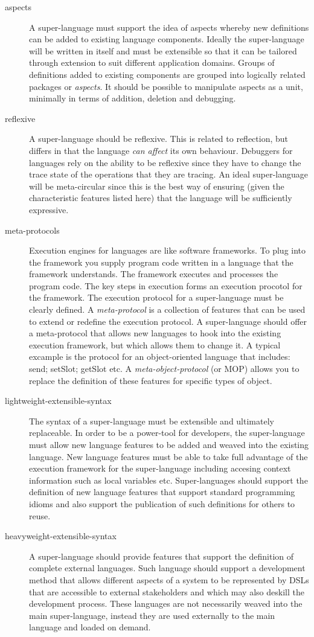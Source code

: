 \begin{description}
\item [{aspects}] A super-language must support the idea of aspects whereby
new definitions can be added to existing language components. Ideally
the super-language will be written in itself and must be extensible
so that it can be tailored through extension to suit different application
domains. Groups of definitions added to existing components are grouped
into logically related packages or \emph{aspects}. It should be possible
to manipulate aspects as a unit, minimally in terms of addition, deletion
and debugging.
\item [{reflexive}] A super-language should be reflexive. This is related
to reflection, but differs in that the language \emph{can affect}
its own behaviour. Debuggers for languages rely on the ability to
be reflexive since they have to change the trace state of the operations
that they are tracing. An ideal super-language will be meta-circular
since this is the best way of ensuring (given the characteristic features
listed here) that the language will be sufficiently expressive.
\item [{meta-protocols}] Execution engines for languages are like software
frameworks. To plug into the framework you supply program code written
in a language that the framework understands. The framework executes
and processes the program code. The key steps in execution forms an
execution procotol for the framework. The execution protocol for a
super-language must be clearly defined. A \emph{meta-protocol }is
a collection of features that can be used to extend or redefine the
execution protocol. A super-language should offer a meta-protocol
that allows new languages to hook into the existing execution framework,
but which allows them to change it. A typical excample is the protocol
for an object-oriented language that includes: send; setSlot; getSlot
etc. A \emph{meta-object-protocol} (or MOP) allows you to replace
the definition of these features for specific types of object. 
\item [{lightweight-extensible-syntax}] The syntax of a super-language
must be extensible and ultimately replaceable. In order to be a power-tool
for developers, the super-language must allow new language features
to be added and weaved into the existing language. New language features
must be able to take full advantage of the execution framework for
the super-language including accesing context information such as
local variables etc. Super-languages should support the definition
of new language features that support standard programming idioms
and also support the publication of such definitions for others to
reuse.
\item [{heavyweight-extensible-syntax}] A super-language should provide
features that support the definition of complete external languages.
Such language should support a development method that allows different
aspects of a system to be represented by DSLs that are accessible
to external stakeholders and which may also deskill the development
process. These languages are not necessarily weaved into the main
super-language, instead they are used externally to the main language
and loaded on demand.
\end{description}

